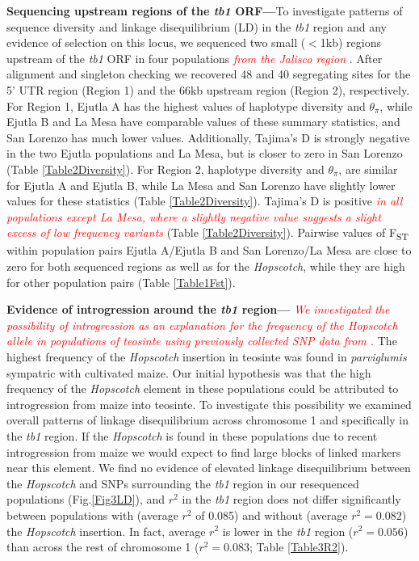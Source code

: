 \documentclass[11pt]{article} %
\newcommand{\track}[1]{\textcolor{red}{\emph{\normalsize #1}} }
\begin{document}
\begin{linenumbers}
\begin{flushleft}
\textbf{Sequencing upstream regions of the \emph{tb1} ORF---}To investigate patterns of sequence diversity and linkage disequilibrium (LD) in the \emph{tb1} region and any evidence of selection on this locus, we sequenced two small ($<$1kb) regions upstream of the \emph{tb1} ORF in four populations \track{from the Jalisco region}. After alignment and singleton checking we recovered 48 and 40 segregating sites for the 5' UTR region (Region 1) and the 66kb upstream region (Region 2), respectively. For Region 1, Ejutla A has the highest values of haplotype diversity and $\theta_\pi$, while Ejutla B and La Mesa have comparable values of these summary statistics, and San Lorenzo has much lower values. Additionally, Tajima's D is strongly negative in the two Ejutla populations and La Mesa, but is closer to zero in San Lorenzo (Table \ref{Table2Diversity}). For Region 2, haplotype diversity and $\theta_\pi$, are similar for Ejutla A and Ejutla B, while La Mesa and San Lorenzo have slightly lower values for these statistics (Table \ref{Table2Diversity}). Tajima's D is positive \track{in all populations except La Mesa, where a slightly negative value suggests a slight excess of low frequency variants} (Table \ref{Table2Diversity}). Pairwise values of F\textsubscript{ST} within population pairs Ejutla A/Ejutla B and San Lorenzo/La Mesa are close to zero for both sequenced regions as well as for the \emph{Hopscotch}, while they are high for other population pairs (Table \ref{Table1Fst}). 

\textbf{Evidence of introgression around the \emph{tb1} region---} \track{We investigated the possibility of introgression as an explanation for the frequency of the \emph{Hopscotch} allele in populations of teosinte using previously collected SNP data from \citep{Pyhajarvi2013}.} The highest frequency of the \emph{Hopscotch} insertion in teosinte was found in \emph{parviglumis} sympatric with cultivated maize. Our initial hypothesis was that the high frequency of the \emph{Hopscotch} element in these populations could be attributed to introgression from maize into teosinte. To investigate this possibility we examined overall patterns of linkage disequilibrium across chromosome 1 and specifically in the \emph{tb1} region. If the \emph{Hopscotch} is found in these populations due to recent introgression from maize we would expect to find large blocks of linked markers near this element. We find no evidence of elevated linkage disequilibrium between the \emph{Hopscotch} and SNPs surrounding the \emph{tb1} region in our resequenced populations (Fig.\ref{Fig3LD}), and $r^{2}$ in the \emph{tb1} region  does not differ significantly between populations with (average $r^{2}$ of 0.085) and without (average $r^{2}=0.082$) the \emph{Hopscotch} insertion. In fact, average $r^{2}$ is lower in the \emph{tb1} region ($r^{2}=0.056$) than across the rest of chromosome 1 ($r^{2}=0.083$; Table \ref{Table3R2}).


\end{flushleft}
\end{linenumbers}
\end{document}
